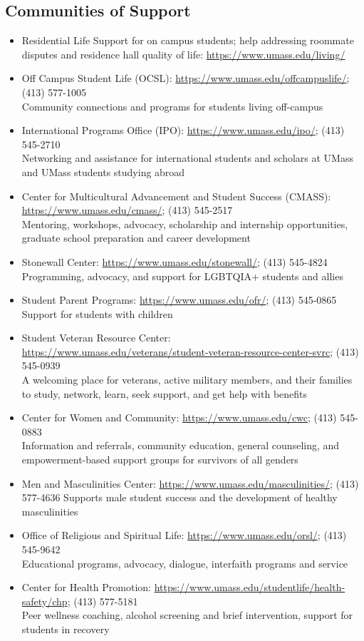 \documentclass[11pt,twoside]{article}
\numberwithin{equation}{section}
\newcommand{\?}{\stackrel{?}{=}}
\begin{document}
   \subsection{Communities of Support}
\begin{itemize}
\item  Residential Life Support for on campus students; help addressing roommate disputes and residence hall quality of life: \url{https://www.umass.edu/living/}
   \item  Off Campus Student Life (OCSL): \url{https://www.umass.edu/offcampuslife/}; (413) 577-1005\\
Community connections and programs for students living off-campus
   \item  International Programs Office (IPO): \url{https://www.umass.edu/ipo/}; (413) 545-2710\\
Networking and assistance for international students and scholars at UMass and UMass students studying abroad
   \item  Center for Multicultural Advancement and Student Success (CMASS): \url{https://www.umass.edu/cmass/}; (413) 545-2517\\
Mentoring, workshops, advocacy, scholarship and internship opportunities, graduate school preparation and career development
   \item  Stonewall Center: \url{https://www.umass.edu/stonewall/}; (413) 545-4824\\
Programming, advocacy, and support for LGBTQIA+ students and allies
   \item  Student Parent Programs: \url{https://www.umass.edu/ofr/}; (413) 545-0865\\
Support for students with children
   \item  Student Veteran Resource Center:\\ \url{https://www.umass.edu/veterans/student-veteran-resource-center-svrc}; (413) 545-0939\\
A welcoming place for veterans, active military members, and their families to study, network, learn, seek support, and get help with benefits
   \item  Center for Women and Community: \url{https://www.umass.edu/cwc};  (413) 545-0883\\
Information and referrals, community education, general counseling, and empowerment-based support groups for survivors of all genders
   \item  Men and Masculinities Center: \url{https://www.umass.edu/masculinities/}; (413) 577-4636
Supports male student success and the development of healthy masculinities
   \item  Office of Religious and Spiritual Life: \url{https://www.umass.edu/orsl/}; (413) 545-9642\\
Educational programs, advocacy, dialogue, interfaith programs and service
   \item  Center for Health Promotion: \url{https://www.umass.edu/studentlife/health-safety/chp}; (413) 577-5181\\
     Peer wellness coaching, alcohol screening and brief intervention, support for students in recovery
   \end{itemize}
\end{document}
